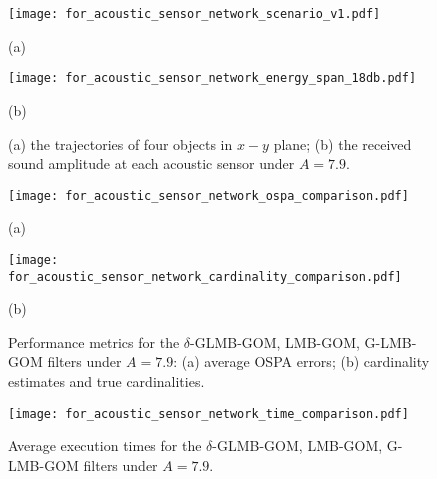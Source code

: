 \documentclass[journal]{IEEEtran}
\begin{document}
{\begin{figure}[h]
\setlength{\abovecaptionskip}{-7pt}
\setlength{\belowcaptionskip}{-7pt}
\begin{minipage}[b]{0.48\linewidth}
  \centering
\centerline{\texttt{[image: for\_acoustic\_sensor\_network\_scenario\_v1.pdf]}}
\centerline{\small{\small{(a)}} }\medskip
\end{minipage}
\hfill
\begin{minipage}[b]{0.48\linewidth}
  \centering
\centerline{\texttt{[image: for\_acoustic\_sensor\_network\_energy\_span\_18db.pdf]}}
\centerline{\small{\small{(b)}}}\medskip
\end{minipage}
\caption{(a)  the trajectories of four objects in $x-y$ plane; (b) the received sound amplitude at each acoustic sensor under $A=7.9$.}
  \label{fig: scenario and time}
\end{figure}
\begin{figure}[h]
\setlength{\abovecaptionskip}{-7pt}
\setlength{\belowcaptionskip}{-7pt}
\begin{minipage}[b]{0.48\linewidth}
  \centering
\centerline{\texttt{[image: for\_acoustic\_sensor\_network\_ospa\_comparison.pdf]}}
\centerline{\small{\small{(a)}} }\medskip
\end{minipage}
\hfill
\begin{minipage}[b]{0.47\linewidth}
  \centering
\centerline{\texttt{[image: for\_acoustic\_sensor\_network\_cardinality\_comparison.pdf]}}
\centerline{\small{\small{(b)}}}\medskip
\end{minipage}
\caption{Performance metrics for the $\delta$-GLMB-GOM, LMB-GOM, G-LMB-GOM filters under $A=7.9$: (a) average OSPA errors; (b) cardinality estimates and true cardinalities.}
  \label{fig: performance of four targets}
\end{figure}

\begin{figure}[t]
  \centering
  \texttt{[image: for\_acoustic\_sensor\_network\_time\_comparison.pdf]}\\
  \caption{Average execution times  for the $\delta$-GLMB-GOM, LMB-GOM, G-LMB-GOM filters under  $A=7.9$.}
  \label{fig:time comparison}
\end{figure}





}
\end{document}
